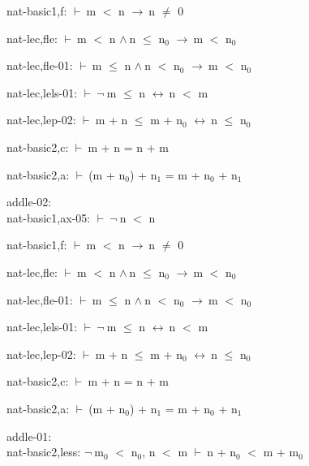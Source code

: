 \documentclass[a4paper]{article}
\newcommand{\Fol}{\mbox{$\vdash\ $}}
\newcommand{\Not}{\mbox{$\neg\ $}}
\newcommand{\And}{\mbox{$\wedge\ $}}
\newcommand{\Imp}{\mbox{$\rightarrow\ $}}
\newcommand{\Equiv}{\mbox{$\leftrightarrow\ $}}
\begin{document}
nat-basic1,f: 
 \Fol m $<$ n \Imp n $\neq$ 0



nat-lec,fle: 
 \Fol m $<$ n \And n $\le$ $\mbox{n}_{0}$ \Imp m $<$ $\mbox{n}_{0}$



nat-lec,fle-01: 
 \Fol m $\le$ n \And n $<$ $\mbox{n}_{0}$ \Imp m $<$ $\mbox{n}_{0}$



nat-lec,lels-01: 
 \Fol \Not m $\le$ n \Equiv n $<$ m



nat-lec,lep-02: 
 \Fol m + n $\le$ m + $\mbox{n}_{0}$ \Equiv n $\le$ $\mbox{n}_{0}$



nat-basic2,c: 
 \Fol m + n = n + m



nat-basic2,a: 
 \Fol (m + $\mbox{n}_{0}$) + $\mbox{n}_{1}$ = m + $\mbox{n}_{0}$ + $\mbox{n}_{1}$



\bigskip

addle-02:\\ nat-basic1,ax-05: 
 \Fol \Not n $<$ n



nat-basic1,f: 
 \Fol m $<$ n \Imp n $\neq$ 0



nat-lec,fle: 
 \Fol m $<$ n \And n $\le$ $\mbox{n}_{0}$ \Imp m $<$ $\mbox{n}_{0}$



nat-lec,fle-01: 
 \Fol m $\le$ n \And n $<$ $\mbox{n}_{0}$ \Imp m $<$ $\mbox{n}_{0}$



nat-lec,lels-01: 
 \Fol \Not m $\le$ n \Equiv n $<$ m



nat-lec,lep-02: 
 \Fol m + n $\le$ m + $\mbox{n}_{0}$ \Equiv n $\le$ $\mbox{n}_{0}$



nat-basic2,c: 
 \Fol m + n = n + m



nat-basic2,a: 
 \Fol (m + $\mbox{n}_{0}$) + $\mbox{n}_{1}$ = m + $\mbox{n}_{0}$ + $\mbox{n}_{1}$



\bigskip

addle-01:\\ nat-basic2,less: 
\Not $\mbox{m}_{0}$ $<$ $\mbox{n}_{0}$, 
n $<$ m
 \Fol n + $\mbox{n}_{0}$ $<$ m + $\mbox{m}_{0}$
\end{document}
